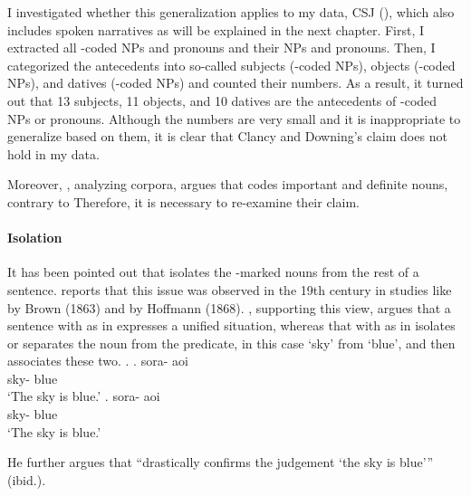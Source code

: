 I investigated whether this generalization applies to
my data, CSJ (), which also includes spoken narratives as will be explained in the next chapter.
First, I extracted all -coded NPs and pronouns and their  NPs and pronouns.
Then, I categorized the antecedents into
so-called subjects (-coded NPs),
objects (-coded NPs), and datives (-coded NPs) and
counted their numbers.
As a result,
it turned out that
13 subjects, 11 objects, and 10 datives are the antecedents of
-coded NPs or pronouns.
Although the numbers are very small and it is inappropriate to generalize based on them,
it is clear that
Clancy and Downing's claim does not hold in my data.

Moreover, , analyzing corpora, argues that
 codes important and definite nouns, contrary to 
Therefore, it is necessary to re-examine their claim.


\paragraph{Isolation}


It has been pointed out that
 isolates the -marked nouns from the rest of a sentence.
 reports that this issue was observed in the 19th century
in studies like  by Brown (1863) and
 by Hoffmann (1868).
, supporting this view,
argues that a sentence with  as in \Next[a] expresses a unified situation,
whereas that with  as in \Next[b] isolates or separates
the noun from the predicate,
in this case
 `sky' from  `blue',
and then associates these two.
%
\ex.
 \ag. sora- aoi \\
      sky- blue \\
      `The sky is blue.'
 \bg. sora- aoi \\
      sky- blue \\
      `The sky is blue.'

He further argues that
 ``drastically confirms the  judgement `the sky is blue'{''} (ibid.).

